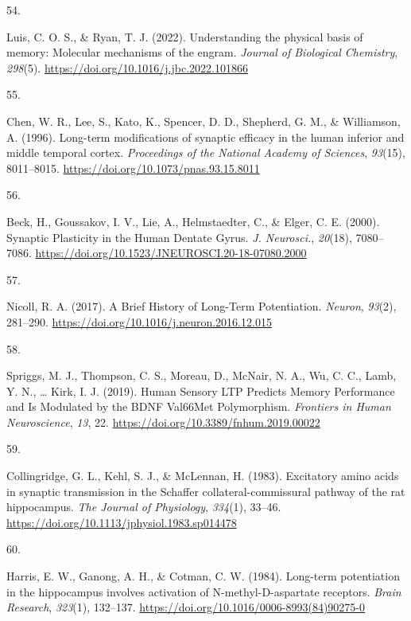 \documentclass[
  11pt,
  letterpaper,
]{scrreprt}
\newlength{\cslhangindent}
\newlength{\csllabelwidth}
\newenvironment{CSLReferences}[2] %
 {\begin{list}{}{%
  \setlength{\itemindent}{0pt}
  \setlength{\leftmargin}{0pt}
  \setlength{\parsep}{0pt}
  \ifodd #1
   \setlength{\leftmargin}{\cslhangindent}
   \setlength{\itemindent}{-1\cslhangindent}
  \fi
  \setlength{\itemsep}{#2\baselineskip}}}
 {\end{list}}
\newcommand{\CSLLeftMargin}[1]{\parbox[t]{\csllabelwidth}{\strut#1\strut}}
\newcommand{\CSLRightInline}[1]{\parbox[t]{\linewidth - \csllabelwidth}{\strut#1\strut}}
\begin{document}
\begin{CSLReferences}{0}{0}
\CSLLeftMargin{54. }%
\CSLRightInline{Luis, C. O. S., \& Ryan, T. J. (2022). Understanding the
physical basis of memory: {Molecular} mechanisms of the engram.
\emph{Journal of Biological Chemistry}, \emph{298}(5).
\url{https://doi.org/10.1016/j.jbc.2022.101866}}

\CSLLeftMargin{55. }%
\CSLRightInline{Chen, W. R., Lee, S., Kato, K., Spencer, D. D.,
Shepherd, G. M., \& Williamson, A. (1996). Long-term modifications of
synaptic efficacy in the human inferior and middle temporal cortex.
\emph{Proceedings of the National Academy of Sciences}, \emph{93}(15),
8011--8015. \url{https://doi.org/10.1073/pnas.93.15.8011}}

\CSLLeftMargin{56. }%
\CSLRightInline{Beck, H., Goussakov, I. V., Lie, A., Helmstaedter, C.,
\& Elger, C. E. (2000). Synaptic {Plasticity} in the {Human Dentate
Gyrus}. \emph{J. Neurosci.}, \emph{20}(18), 7080--7086.
\url{https://doi.org/10.1523/JNEUROSCI.20-18-07080.2000}}

\CSLLeftMargin{57. }%
\CSLRightInline{Nicoll, R. A. (2017). A {Brief History} of {Long-Term
Potentiation}. \emph{Neuron}, \emph{93}(2), 281--290.
\url{https://doi.org/10.1016/j.neuron.2016.12.015}}

\CSLLeftMargin{58. }%
\CSLRightInline{Spriggs, M. J., Thompson, C. S., Moreau, D., McNair, N.
A., Wu, C. C., Lamb, Y. N., \ldots{} Kirk, I. J. (2019). Human {Sensory
LTP Predicts Memory Performance} and {Is Modulated} by the {BDNF
Val66Met Polymorphism}. \emph{Frontiers in Human Neuroscience},
\emph{13}, 22. \url{https://doi.org/10.3389/fnhum.2019.00022}}

\CSLLeftMargin{59. }%
\CSLRightInline{Collingridge, G. L., Kehl, S. J., \& McLennan, H.
(1983). Excitatory amino acids in synaptic transmission in the
{Schaffer} collateral-commissural pathway of the rat hippocampus.
\emph{The Journal of Physiology}, \emph{334}(1), 33--46.
\url{https://doi.org/10.1113/jphysiol.1983.sp014478}}

\CSLLeftMargin{60. }%
\CSLRightInline{Harris, E. W., Ganong, A. H., \& Cotman, C. W. (1984).
Long-term potentiation in the hippocampus involves activation of
{N-methyl-D-aspartate} receptors. \emph{Brain Research}, \emph{323}(1),
132--137. \url{https://doi.org/10.1016/0006-8993(84)90275-0}}


\end{CSLReferences}
\end{document}
